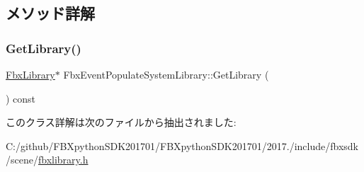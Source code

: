 \subsection{メソッド詳解}
\mbox{\label{class_fbx_event_populate_system_library_a9916adf51d1fed8a4c6aeb8f12587ce0}} 
\subsubsection{\texorpdfstring{Get\+Library()}{GetLibrary()}}
{\footnotesize\ttfamily \hyperlink{class_fbx_library}{Fbx\+Library}$\ast$ Fbx\+Event\+Populate\+System\+Library\+::\+Get\+Library (\begin{DoxyParamCaption}{ }\end{DoxyParamCaption}) const}



このクラス詳解は次のファイルから抽出されました\+:\begin{DoxyCompactItemize}
\item 
C\+:/github/\+F\+B\+Xpython\+S\+D\+K201701/\+F\+B\+Xpython\+S\+D\+K201701/2017./include/fbxsdk/scene/\hyperlink{fbxlibrary_8h}{fbxlibrary.\+h}\end{DoxyCompactItemize}

